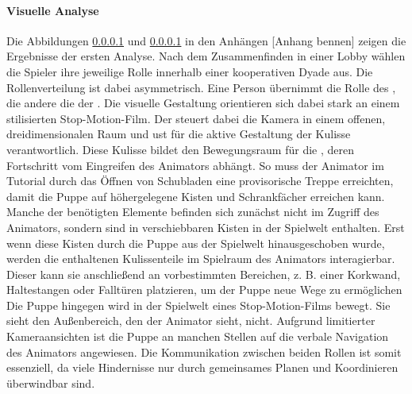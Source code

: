 \paragraph{Visuelle Analyse}
Die Abbildungen \ref{} und \ref{} in den Anhängen [Anhang bennen] zeigen die Ergebnisse der ersten Analyse. Nach dem Zusammenfinden in einer Lobby wählen die Spieler ihre jeweilige Rolle innerhalb einer kooperativen Dyade aus. Die Rollenverteilung ist dabei asymmetrisch. Eine Person übernimmt die Rolle des , die andere die der . Die visuelle Gestaltung orientieren sich dabei stark an einem stilisierten Stop-Motion-Film. 
Der  steuert dabei die Kamera in einem offenen, dreidimensionalen Raum und ust für die aktive Gestaltung der Kulisse verantwortlich. Diese Kulisse bildet den Bewegungsraum für die , deren Fortschritt vom Eingreifen des Animators abhängt. So muss der Animator im Tutorial durch das Öffnen von Schubladen eine provisorische Treppe erreichten, damit die Puppe auf höhergelegene Kisten und Schrankfächer erreichen kann. 
Manche der benötigten Elemente befinden sich zunächst nicht im Zugriff des Animators, sondern sind in verschiebbaren Kisten in der Spielwelt enthalten. Erst wenn diese Kisten durch die Puppe aus der Spielwelt hinausgeschoben wurde, werden die enthaltenen Kulissenteile im Spielraum des Animators interagierbar. Dieser kann sie anschließend an vorbestimmten Bereichen, z. B. einer Korkwand, Haltestangen oder Falltüren platzieren, um der Puppe neue Wege zu ermöglichen
Die Puppe hingegen wird in der Spielwelt eines Stop-Motion-Films bewegt. Sie sieht den Außenbereich, den der Animator sieht, nicht. Aufgrund limitierter Kameraansichten ist die Puppe an manchen Stellen auf die verbale Navigation des Animators angewiesen. Die Kommunikation zwischen beiden Rollen ist somit essenziell, da viele Hindernisse nur durch gemeinsames Planen und Koordinieren überwindbar sind.

